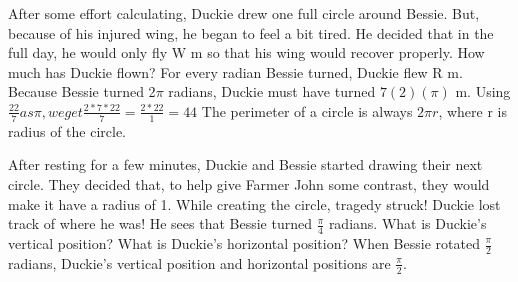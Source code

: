  {After some effort calculating, Duckie drew one full circle around Bessie. But, because of his injured wing, he began to feel a bit tired. He decided that in the full day, he would only fly W m so that his wing would recover properly. How much has Duckie flown?}
 {For every radian Bessie turned, Duckie flew R m. Because Bessie turned 2$\pi$ radians, Duckie must have turned $7(2)(\pi) $ m. Using $\frac{22}{7} as \pi, we get \frac{2*7*22}{7}=\frac{2*22}{1}=44$}
 {The perimeter of a circle is always $2\pi r$, where r is radius of the circle.}
 {}
 {After resting for a few minutes, Duckie and Bessie started drawing their next circle. They decided that, to help give Farmer John some contrast, they would make it have a radius of 1. While creating the circle, tragedy struck! Duckie lost track of where he was! He sees that Bessie turned $\frac{\pi}{4}$ radians. What is Duckie's vertical position? What is Duckie's horizontal position?}
 {When Bessie rotated $\frac{\pi}{2}$ radians, Duckie's vertical position and horizontal positions are $\frac{\pi}{2}$.}
